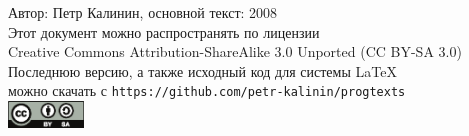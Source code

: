 \documentclass[a4paper,10pt]{problems}
\begin{document}
\begin{flushright}
Автор: Петр Калинин, основной текст: 2008\\
Этот документ можно распространять по лицензии\\
Creative Commons Attribution-ShareAlike 3.0 Unported (CC BY-SA 3.0)\\
Последнюю версию, а также исходный код для системы \LaTeX\\
можно скачать с \verb`https://github.com/petr-kalinin/progtexts`\\
\includegraphics[width=2cm]{by-sa-corr.eps}
\end{flushright}




\end{document}
